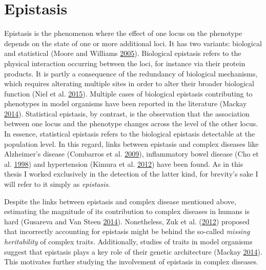 \documentclass[
  11pt,
]{env/yjiao}
\begin{document}
\hypertarget{intro-epistasis}{%
\section{Epistasis}\label{intro-epistasis}}

Epistasis is the phenomenon where the effect of one locus on the phenotype depends on the state of one or more additional loci. It has two variants: biological and statistical (Moore and Williams \protect\hyperlink{ref-moore_traversing_2005}{2005}). Biological epistasis refers to the physical interaction occurring between the loci, for instance via their protein products. It is partly a consequence of the redundancy of biological mechanisms, which requires alterating multiple sites in order to alter their broader biological function (Niel et al. \protect\hyperlink{ref-niel_survey_2015}{2015}). Multiple cases of biological epistasis contributing to phenotypes in model organisms have been reported in the literature (Mackay \protect\hyperlink{ref-mackay_epistasis_2014}{2014}). Statistical epistasis, by contrast, is the observation that the association between one locus and the phenotype changes across the level of the other locus. In essence, statistical epistasis refers to the biological epistasis detectable at the population level. In this regard, links between epistasis and complex diseases like Alzheimer's disease (Combarros et al. \protect\hyperlink{ref-combarros_epistasis_2009}{2009}), inflammatory bowel disease (Cho et al. \protect\hyperlink{ref-cho_identification_1998}{1998}) and hypertension (Kimura et al. \protect\hyperlink{ref-kimura_multilocus_2012}{2012}) have been found. As in this thesis I worked exclusively in the detection of the latter kind, for brevity's sake I will refer to it simply as \emph{epistasis}.

Despite the links between epistasis and complex disease mentioned above, estimating the magnitude of its contribution to complex diseases in humans is hard (Gusareva and Van Steen \protect\hyperlink{ref-gusareva_practical_2014}{2014}). Nonetheless, Zuk et al. (\protect\hyperlink{ref-zuk_mystery_2012}{2012}) proposed that incorrectly accounting for epistasis might be behind the so-called \emph{missing heritability} of complex traits. Additionally, studies of traits in model organisms suggest that epistasis plays a key role of their genetic architecture (Mackay \protect\hyperlink{ref-mackay_epistasis_2014}{2014}). This motivates further studying the involvement of epistasis in complex diseases.
\end{document}
